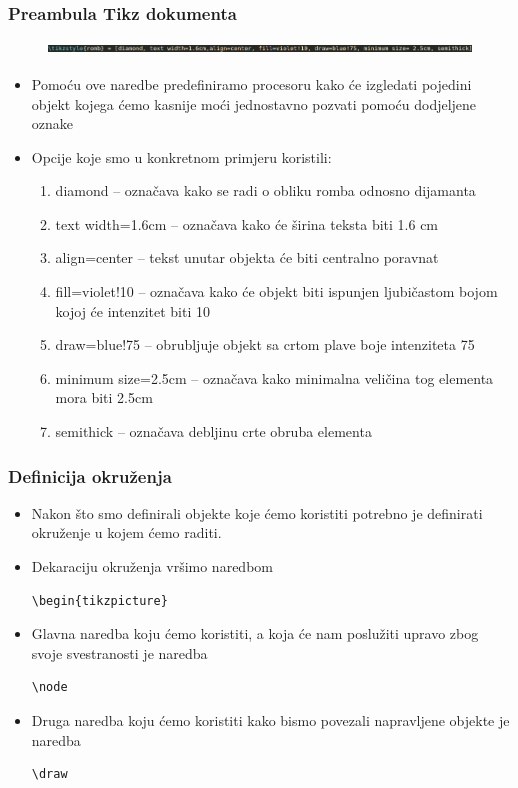 \documentclass{beamer}
\begin{document}
	\begin{frame}
	\frametitle{Preambula Tikz dokumenta}
		\begin{figure}
			\begin{center}
				\includegraphics[width=12 cm,height=0.4cm]{Slike/tikzstyle.png}
			\end{center}
		\end{figure}
		\begin{itemize}
		\item Pomoću ove naredbe predefiniramo procesoru kako će izgledati pojedini objekt kojega ćemo kasnije moći jednostavno pozvati pomoću dodjeljene oznake
		\item Opcije koje smo u konkretnom primjeru koristili:
			\begin{enumerate}
				\item diamond – označava kako se radi o obliku romba odnosno dijamanta
				\item text width=1.6cm – označava kako će širina teksta biti 1.6 cm
				\item align=center – tekst unutar objekta će biti centralno poravnat
				\item fill=violet!10 – označava kako će objekt biti ispunjen ljubičastom bojom kojoj će intenzitet biti 10%
				\item draw=blue!75 – obrubljuje objekt sa crtom plave boje intenziteta 75%
				\item minimum size=2.5cm – označava kako minimalna veličina tog elementa mora biti 2.5cm
				\item semithick – označava debljinu crte obruba elementa
			\end{enumerate}
  		\end{itemize}	
	\end{frame}

\begin{frame}[fragile]
	\frametitle{Definicija okruženja}
		\begin{itemize}
		\item Nakon što smo definirali objekte koje ćemo koristiti potrebno je definirati okruženje u kojem ćemo raditi.
		\item Dekaraciju okruženja vršimo naredbom \begin{verbatim}\begin{tikzpicture}\end{verbatim}
		\item Glavna naredba koju ćemo koristiti, a koja će nam poslužiti upravo zbog svoje svestranosti je naredba \begin{verbatim}\node\end{verbatim} 
		\item Druga naredba koju ćemo koristiti kako bismo povezali napravljene objekte je naredba \begin{verbatim}\draw\end{verbatim}
  		\end{itemize}	
\end{frame}
\end{document}

